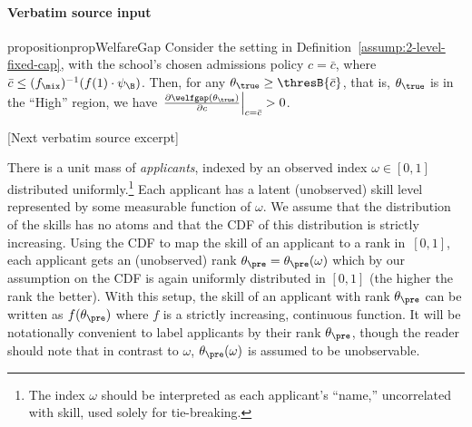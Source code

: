 \documentclass[10pt]{article}
\begin{document}
\paragraph{Verbatim source input}
\begin{ReviewVerbatim}
\begin{restatable}{proposition}{propWelfareGap}\label{prop:deriv-welfare-gap}
	Consider the setting in Definition~\ref{assump:2-level-fixed-cap}, with the school's chosen admissions policy $c=\bar{c}$, where $\bar{c} \le  (f_\mix)^{-1}(f(1)\cdot \psi_\B)$. Then, for any $\theta_\true \geq \thresB{\bar{c}}$, that is, $\theta_\true$ is in the ``High'' region, we have
	\(\left.\frac{\partial \welfgap(\theta_\true)}{\partial c}\right\vert_{c=\bar{c}}> 0\).
\end{restatable}

[Next verbatim source excerpt]

There is a unit mass of \textit{applicants}, indexed by an observed index $\omega \in [0,1]$ distributed uniformly.\footnote{The index $\omega$ should be interpreted as each applicant's ``name,'' uncorrelated with skill, used solely for tie-breaking.}  Each applicant has a latent (unobserved) skill level represented by some measurable function of $\omega$.
We assume that {the distribution of the skills} has no atoms and that the CDF of this distribution is strictly increasing.
Using the CDF to map the skill of an applicant to a rank in~$[0,1]$, each applicant gets an (unobserved) rank $\theta_\pre =\theta_\pre(\omega)$ which by our assumption on the CDF is again uniformly distributed in $[0, 1]$ (the higher the rank the better).  With this setup, the skill of an applicant with rank $\theta_\pre$ can be written as $f(\theta_\pre)$ where $f$ is a strictly increasing, continuous function.  {It will be notationally convenient to label applicants by their rank $\theta_\pre$, though the reader should note that in contrast to $\omega$, $\theta_\pre(\omega)$ is assumed to be unobservable.}




\end{ReviewVerbatim}
\end{document}
